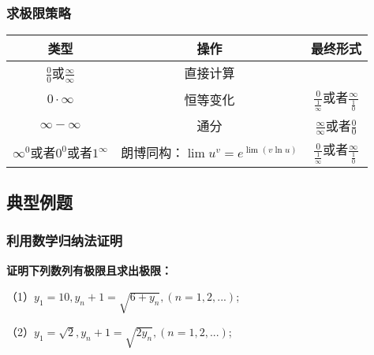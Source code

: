 \documentclass[12pt , a4paper , oneside]{ctexart}
\begin{document}
            \subsubsection{求极限策略}
            \begin{center}
            \begin{tabular}{c|c|c}
                \toprule
                \textbf{类型} & \textbf{操作} & \textbf{最终形式} \\  %
                \midrule
                $\frac{0}{0}$或$\frac{\infty}{\infty}$ & 直接计算 &  \\  %
                $0 \cdot \infty$ & 恒等变化 & $\frac{0}{\frac{1}{\infty}}$或者$\frac{\infty}{\frac{1}{0}}$\\  %
                $\infty - \infty$ & 通分 & $\frac{\infty}{\infty}$或者$\frac{0}{0}$ \\  %
                $\infty ^ 0$或者$0^0$或者$1^\infty$ & 朗博同构：$\lim u^v = e^{\lim(v\ln u)}$ & $\frac{0}{\frac{1}{\infty}}$或者$\frac{\infty}{\frac{1}{0}}$\\
                \bottomrule
            \end{tabular}
            \end{center}

        \subsection{典型例题}
            \subsubsection{利用数学归纳法证明}
            \textbf{证明下列数列有极限且求出极限：}

            （1）$y_1=10,y_n+1 = \sqrt{6+y_n},(n=1,2,...)$;

            （2）$y_1=\sqrt{2},y_n+1 = \sqrt{2 y_n},(n=1,2,...)$;
\end{document}
